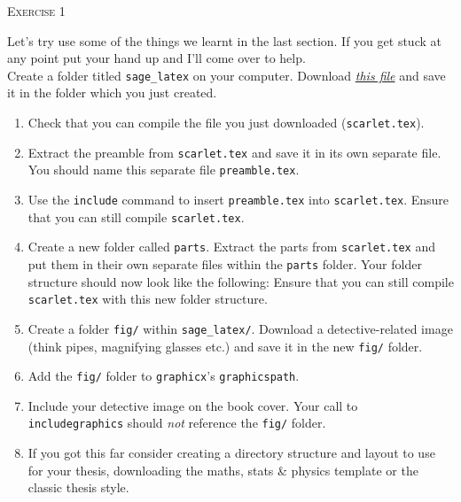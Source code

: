 \documentclass{article}
\begin{document}
\begin{center}
  \Large\color{black!80}\textsc{Exercise 1}
\end{center}

Let's try use some of the things we learnt in the last section. If you
get stuck at any point put your hand up and I'll come over to help.\\

Create a folder titled \texttt{sage\_latex} on your computer. Download
\href{https://jwalton.info/assets/teaching/latex/scarlet.tex}{\emph{this file}} 
and save it in the folder which you just created.

\begin{enumerate}[label=\color{purple}\theenumi.]
  \item Check that you can compile the file you just downloaded
    (\texttt{scarlet.tex}).

  \item Extract the preamble from \texttt{scarlet.tex} and save it in its own
    separate file. You should name this separate file
    \texttt{preamble.tex}.

  \item Use the \texttt{\tb include} command to insert
    \texttt{preamble.tex} into \texttt{scarlet.tex}. Ensure that you can
    still compile \texttt{scarlet.tex}.

  \item{Create a new folder called \texttt{parts}. Extract the parts from 
    \texttt{scarlet.tex} and put them in their own separate files within
    the \texttt{parts} folder. Your folder structure should now look
    like the following:
    \vspace{0.25cm}
    Ensure that you can still compile \texttt{scarlet.tex} with this new 
    folder structure.}

  \item Create a folder \texttt{fig/} within \texttt{sage\_latex/}. Download a
    detective-related image (think pipes, magnifying glasses etc.) and
    save it in the new \texttt{fig/} folder.

  \item Add the \texttt{fig/} folder to \texttt{graphicx}'s
    \texttt{graphicspath}.

  \item Include your detective image on the book cover. Your call to
    \texttt{\tb includegraphics} should \emph{not} reference the
    \texttt{fig/} folder.
    
  \item If you got this far consider creating a directory structure and layout
    to use for your thesis, downloading the maths, stats \& physics template or
    the classic thesis style.

\end{enumerate}
\end{document}
